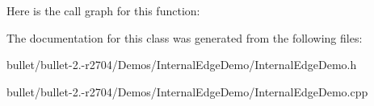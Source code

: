 Here is the call graph for this function\+:




The documentation for this class was generated from the following files\+:\begin{DoxyCompactItemize}
\item 
bullet/bullet-\/2.-\/r2704/\+Demos/\+Internal\+Edge\+Demo/Internal\+Edge\+Demo.\+h\item 
bullet/bullet-\/2.-\/r2704/\+Demos/\+Internal\+Edge\+Demo/Internal\+Edge\+Demo.\+cpp\end{DoxyCompactItemize}
